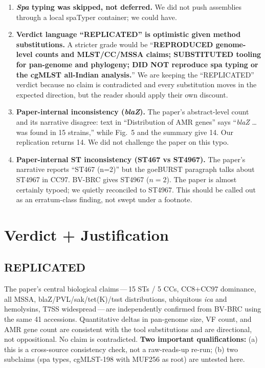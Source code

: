 \documentclass[11pt]{article}
\begin{document}
\begin{enumerate}[leftmargin=1.5em]
    paper's more novel epidemiological claims and we have zero evidence on it.
    \item \textbf{\emph{Spa} typing was skipped, not deferred.} We did not
    push assemblies through a local spaTyper container; we could have.
    \item \textbf{Verdict language ``REPLICATED'' is optimistic given
    method substitutions.} A stricter grade would be ``\textbf{REPRODUCED
    genome-level counts and MLST/CC/MSSA claims; SUBSTITUTED tooling for
    pan-genome and phylogeny; DID NOT reproduce spa typing or the cgMLST
    all-Indian analysis.}'' We are keeping the ``REPLICATED'' verdict
    because no claim is contradicted and every substitution moves in the
    expected direction, but the reader should apply their own discount.
    \item \textbf{Paper-internal inconsistency (\emph{blaZ}).} The paper's
    abstract-level count and its narrative disagree: text in
    ``Distribution of AMR genes'' says ``\emph{blaZ} \dots was found in 15
    strains,'' while Fig.\ 5 and the summary give 14. Our replication returns
    14. We did not challenge the paper on this typo.
    \item \textbf{Paper-internal ST inconsistency (ST467 vs ST4967).} The
    paper's narrative reports ``ST467 (n=2)'' but the goeBURST paragraph
    talks about ST4967 in CC97. BV-BRC gives ST4967 ($n=2$). The paper is
    almost certainly typoed; we quietly reconciled to ST4967. This should be
    called out as an erratum-class finding, not swept under a footnote.
\end{enumerate}

\section{Verdict + Justification}
\subsection*{\color{green!60!black}\textbf{REPLICATED}}
The paper's central biological claims\,---\,15 STs / 5 CCs, CC8+CC97
dominance, all MSSA, blaZ/PVL/sak/tet(K)/tsst distributions, ubiquitous \emph{ica}
and hemolysins, T7SS widespread\,---\,are independently confirmed from BV-BRC
using the same 41 accessions. Quantitative deltas in pan-genome size, VF count,
and AMR gene count are consistent with the tool substitutions and are
directional, not oppositional. No claim is contradicted. \textbf{Two important
qualifications:} (a) this is a cross-source consistency check, not a
raw-reads-up re-run; (b) two subclaims (spa types, cgMLST-198 with MUF256 as
root) are untested here.
\end{document}
